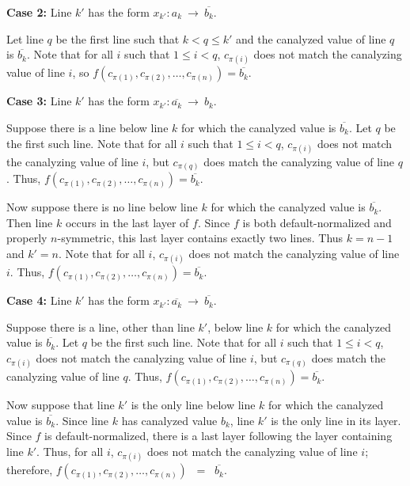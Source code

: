 \medskip

\noindent
{\bf Case 2:} Line $k'$ has the form $x_{k'} : a_k ~\longrightarrow~ \overline{b_k}$.

\smallskip

Let line $q$ be the first line such that $k < q \leq k'$ and
the canalyzed value of line $q$ is $\overline{b_k}$.
Note that for all $i$ such that $1 \leq i < q$, 
$c_{\pi(i)}$ does not match the canalyzing value of line $i$,
so $f(c_{\pi(1)}, c_{\pi(2)}, \ldots, c_{\pi(n)}) = \overline{b_k}$.

\medskip

\noindent
{\bf Case 3:} Line $k'$ has the form $x_{k'} : \overline{a_k} ~\longrightarrow~ b_k$. 

\smallskip

Suppose there is a line below line $k$ for which the canalyzed
value is $\overline{b_k}$.  Let $q$ be the first such line.  Note
that for all $i$ such that $1 \leq i < q$, $c_{\pi(i)}$ does not
match the canalyzing value of line $i$, but $c_{\pi(q)}$ does match
the canalyzing value of line $q$.  Thus, $f(c_{\pi(1)}, c_{\pi(2)},
\ldots, c_{\pi(n)}) = \overline{b_k}$.

Now suppose there is no line below line $k$ for which the canalyzed
value is $\overline{b_k}$.  
Then line $k$ occurs in the last layer of $f$.  
Since $f$ is both default-normalized and properly $n$-symmetric,
this last layer contains exactly two lines.  Thus $k = n-1$ and $k'
= n$.  Note that for all $i$, $c_{\pi(i)}$ does not match the
canalyzing value of line $i$.  Thus, $f(c_{\pi(1)}, c_{\pi(2)},
\ldots, c_{\pi(n)}) = \overline{b_k}$.

\medskip

\noindent
{\bf Case 4:} Line $k'$ has the form $x_{k'} : \overline{a_k} ~\longrightarrow~ 
              \overline{b_k}$. 

\smallskip

Suppose there is a line, other than line $k'$, below line $k$ for
which the canalyzed value is $\overline{b_k}$.  Let $q$ be the
first such line.  Note that for all $i$ such that $1 \leq i < q$,
$c_{\pi(i)}$ does not match the canalyzing value of line $i$, but
$c_{\pi(q)}$ does match the canalyzing value of line $q$.  Thus,
$f(c_{\pi(1)}, c_{\pi(2)}, \ldots, c_{\pi(n)}) = \overline{b_k}$.

Now suppose that line $k'$ is the only line below line $k$ for which
the canalyzed value is $\overline{b_k}$.  Since line $k$ has
canalyzed value $b_k$, line $k'$ is the only line in its layer.
Since $f$ is default-normalized, there is a last layer following the layer
containing line $k'$.  Thus, for all $i$, $c_{\pi(i)}$ does not
match the canalyzing value of line $i$; therefore, 
$f(c_{\pi(1)}, c_{\pi(2)}, \ldots, c_{\pi(n)})$ ~=~ $\overline{b_k}$.  \QED

